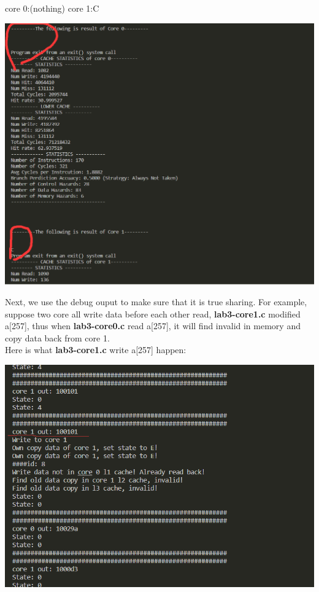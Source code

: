 \mathbb{R} \documentclass{article}
\begin{document}
core 0:(nothing)   core 1:C
\begin{center}
  \includegraphics[scale = 0.2]{10.png}
\end{center}
Next, we use the debug ouput to make sure that it is true sharing. For example, suppose two core all write data before each other read, \textbf{lab3-core1.c} modified a[257], thus when \textbf{lab3-core0.c} read a[257], it will find invalid in memory and copy data back from core 1.\\
Here is what \textbf{lab3-core1.c} write a[257] happen:
\begin{center}
  \includegraphics[scale = 0.4]{11.png}
\end{center}
\end{document}
